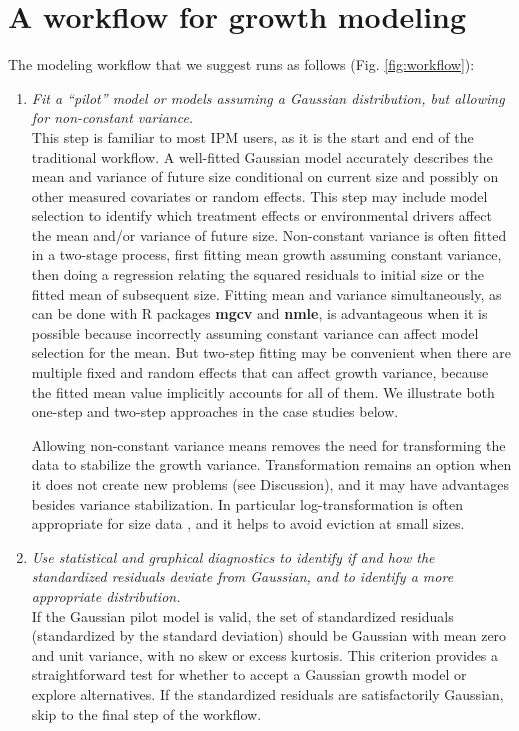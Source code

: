 \documentclass[12pt]{article}
\begin{document}
\section*{A workflow for growth modeling}
The modeling workflow that we suggest runs as follows (Fig. \ref{fig:workflow}):
\begin{enumerate}[label=\arabic*., listparindent=1.5em]
\item \textit{Fit a ``pilot'' model or models assuming a Gaussian distribution, but allowing for non-constant variance.}
\\ 
This step is familiar to most IPM users, as it is the start and end of the traditional workflow. 
A well-fitted Gaussian model accurately describes the mean and variance of future size conditional on current size and possibly on other measured covariates or random effects. 
This step may include model selection to identify which treatment effects or environmental drivers affect the mean and/or variance of future size. 
Non-constant variance is often fitted in a two-stage process, first fitting mean growth assuming constant variance, then doing a regression relating the squared residuals to initial size or the fitted mean of subsequent size. 
Fitting mean and variance simultaneously, as can be done with R packages \textbf{mgcv} and \textbf{nmle}, is advantageous when it is possible because incorrectly assuming constant variance can affect model selection for the mean. 
But two-step fitting may be convenient when there are multiple fixed and random effects that can affect growth variance, because the fitted mean value implicitly accounts for all of them. 
We illustrate both one-step and two-step approaches in the case studies below. 

Allowing non-constant variance means removes the need for transforming the data to stabilize the growth variance. 
Transformation remains an option when it does not create new problems (see Discussion), and it may have advantages besides variance stabilization. %
In particular log-transformation is often appropriate for size data \citep{ellner-etal-2016}, and it helps to avoid eviction at small sizes. 

\item \textit{Use statistical and graphical diagnostics to identify if and how the standardized residuals deviate from Gaussian, and to identify a more appropriate distribution.}
\\
If the Gaussian pilot model is valid, the set of standardized residuals (standardized by the standard deviation) should be Gaussian with mean zero and unit variance, with no skew or excess kurtosis. 
This criterion provides a straightforward test for whether to accept a Gaussian growth model or explore alternatives. 
If the standardized residuals are satisfactorily Gaussian, skip to the final step of the workflow. 


\end{enumerate}
\end{document}
